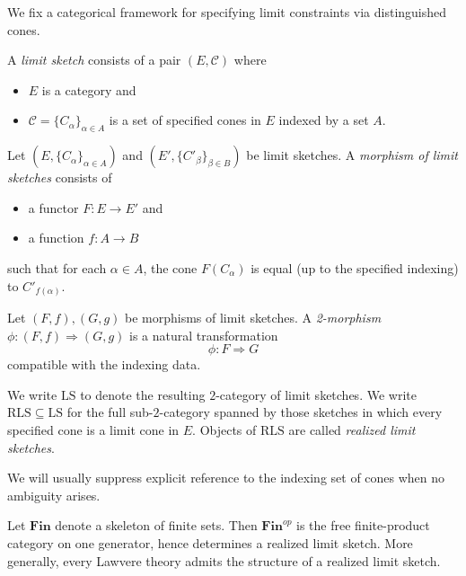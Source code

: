 \documentclass{tac}
\newcommand{\limsk}{\mathrm{LS}}
\newcommand{\relimsk}{\mathrm{RLS}}
\begin{document}
We fix a categorical framework for specifying limit constraints via distinguished cones.

\begin{definition}\label{def_of_lim_sk}
A \emph{limit sketch} consists of a pair $(E, \mathcal{C})$ where
\begin{itemize}
\item $E$ is a category and
\item $\mathcal{C} = \{C_\alpha\}_{\alpha \in A}$ is a set of specified cones in $E$ indexed by a set $A$.
\end{itemize}
\end{definition}

\begin{definition}
Let $(E, \{C_\alpha\}_{\alpha \in A})$ and $(E', \{C'_\beta\}_{\beta \in B})$ be limit sketches. A \emph{morphism of limit sketches} consists of
\begin{itemize}
\item a functor $F : E \to E'$ and
\item a function $f : A \to B$
\end{itemize}
such that for each $\alpha \in A$, the cone $F(C_\alpha)$ is equal (up to the specified indexing) to $C'_{f(\alpha)}$.
\end{definition}

\begin{definition}
Let $(F,f),(G,g)$ be morphisms of limit sketches. A \emph{2-morphism} $\phi : (F,f) \Rightarrow (G,g)$ is a natural transformation
\[
\phi : F \Rightarrow G
\]
compatible with the indexing data.
\end{definition}

\begin{notation}
We write $\limsk$ to denote the resulting $2$-category of limit sketches. We write $\relimsk \subseteq \limsk$ for the full sub-$2$-category spanned by those sketches in which every specified cone is a limit cone in $E$. Objects of $\relimsk$ are called \emph{realized limit sketches}.
\end{notation}

\medskip

We will usually suppress explicit reference to the indexing set of cones when no ambiguity arises.

\begin{example}\label{sk_of_fin_sets}
Let $\mathbf{Fin}$ denote a skeleton of finite sets. Then $\mathbf{Fin}^{op}$ is the free finite-product category on one generator, hence determines a realized limit sketch. More generally, every Lawvere theory admits the structure of a realized limit sketch.
\end{example}
\end{document}
